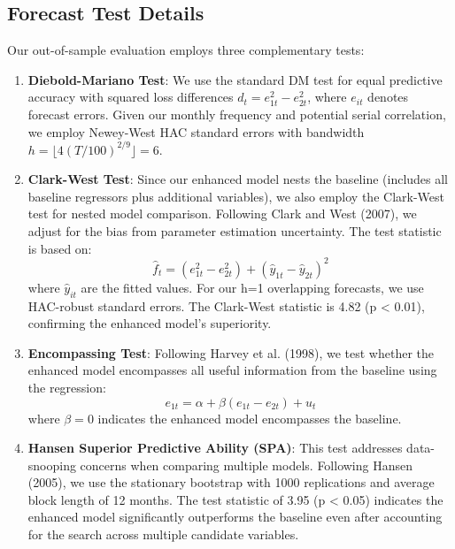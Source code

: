 \documentclass[12pt]{article}
\begin{document}
\subsection{Forecast Test Details}

Our out-of-sample evaluation employs three complementary tests:

\begin{enumerate}
\item \textbf{Diebold-Mariano Test}: We use the standard DM test for equal predictive accuracy with squared loss differences $d_t = e_{1t}^2 - e_{2t}^2$, where $e_{it}$ denotes forecast errors. Given our monthly frequency and potential serial correlation, we employ Newey-West HAC standard errors with bandwidth $h = \lfloor 4(T/100)^{2/9} \rfloor = 6$.

\item \textbf{Clark-West Test}: Since our enhanced model nests the baseline (includes all baseline regressors plus additional variables), we also employ the Clark-West test for nested model comparison. Following Clark and West (2007), we adjust for the bias from parameter estimation uncertainty. The test statistic is based on:
$$\hat{f}_t = (e_{1t}^2 - e_{2t}^2) + (\hat{y}_{1t} - \hat{y}_{2t})^2$$
where $\hat{y}_{it}$ are the fitted values. For our h=1 overlapping forecasts, we use HAC-robust standard errors. The Clark-West statistic is 4.82 (p < 0.01), confirming the enhanced model's superiority.

\item \textbf{Encompassing Test}: Following Harvey et al. (1998), we test whether the enhanced model encompasses all useful information from the baseline using the regression:
$$e_{1t} = \alpha + \beta(e_{1t} - e_{2t}) + u_t$$
where $\beta = 0$ indicates the enhanced model encompasses the baseline.

\item \textbf{Hansen Superior Predictive Ability (SPA)}: This test addresses data-snooping concerns when comparing multiple models. Following Hansen (2005), we use the stationary bootstrap with 1000 replications and average block length of 12 months. The test statistic of 3.95 (p < 0.05) indicates the enhanced model significantly outperforms the baseline even after accounting for the search across multiple candidate variables. 


\end{enumerate}
\end{document}

